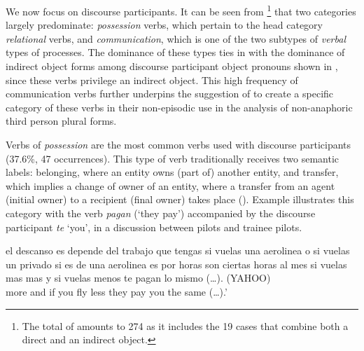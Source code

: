 \documentclass[output=paper]{langscibook}
\begin{document}
We now focus on discourse participants. It can be seen from \footnote{The total of  amounts to 274 as it includes the 19 cases that combine both a direct and an indirect object.}  that two categories largely predominate: \textit{possession} verbs, which pertain to the head category \textit{relational} verbs, and \textit{communication}, which is one of the two subtypes of \textit{verbal} types of processes. The dominance of these types ties in with the dominance of indirect object forms among discourse participant object pronouns shown in , since these verbs privilege an indirect object. This high frequency of communication verbs further underpins the suggestion of \citet{SiewierskaPapastathi2011} to create a specific category of these verbs in their non-episodic use in the analysis of non-anaphoric third person plural forms.


Verbs of \textit{possession} are the most common verbs used with discourse participants (37.6\%, 47 occurrences). This type of verb traditionally receives two semantic labels: belonging, where an entity owns (part of) another entity, and transfer, which implies a change of owner of an entity, where a transfer from an agent (initial owner) to a recipient (final owner) takes place (\citealt{García-MiguelAlbertuz2005}). Example  illustrates this category with the verb \textit{pagan} (‘they pay’) accompanied by the discourse participant \textit{te} ‘you’, in a discussion between pilots and trainee pilots. 

\ea\label{ex:pierre:11}
el descanso es depende del trabajo que tengas si vuelas una aerolinea o si vuelas un privado si es de una aerolinea es por horas son ciertas horas al mes si vuelas mas  mas y si vuelas menos te pagan lo mismo (…). (YAHOO) \\
 {  } {more and if you fly less they pay you the same (…).’}\\
\z 
\end{document}
